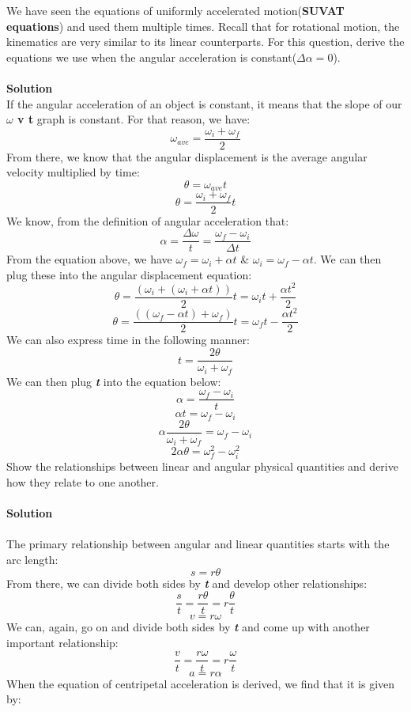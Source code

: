 \documentclass[9pt,addpoints]{exam}
\begin{document}
	
	\begin{questions}
		\question We have seen the equations of uniformly accelerated motion(\textbf{SUVAT equations}) and used them multiple times. Recall that for rotational motion, the kinematics are very similar to its linear counterparts. For this question, derive the equations we use when the angular acceleration is constant($\varDelta\alpha=0$). \\ \\
		\textbf{Solution} \\
		
		If the angular acceleration of an object is constant, it means that the slope of our \textbf{$\omega$ v t} graph is constant. For that reason, we have:
		$$\omega_{ave}=\dfrac{\omega_i+\omega_f}{2}$$
		From there, we know that the angular displacement is the average angular velocity multiplied by time:
		$$\theta=\omega_{ave}t$$
		$$\theta=\dfrac{\omega_i+\omega_f}{2}t$$
		We know, from the definition of angular acceleration that:
		$$\alpha=\dfrac{\varDelta\omega}{t}=\dfrac{\omega_f-\omega_i}{\varDelta t}$$
		From the equation above, we have $\omega_f=\omega_i+\alpha t$ \& $\omega_i=\omega_f-\alpha t$. We can then plug these into the angular displacement equation:
		$$\theta=\dfrac{(\omega_i+(\omega_i+\alpha t))}{2}t=\omega_i t+\dfrac{\alpha t^2}{2}$$
		$$\theta=\dfrac{((\omega_f-\alpha t)+\omega_f)}{2}t=\omega_f t-\dfrac{\alpha t^2}{2}$$
		We can also express time in the following manner:
		$$t=\dfrac{2\theta}{\omega_i+\omega_f}$$
		We can then plug \textit{\textbf{t}} into the equation below:
		$$\alpha=\dfrac{\omega_f-\omega_i}{t}$$
		$$\alpha t=\omega_f-\omega_i$$		
		$$\alpha\dfrac{2\theta}{\omega_i+\omega_f}=\omega_f-\omega_i$$		
		$$2\alpha\theta=\omega_f^2-\omega_i^2$$
		\question Show the relationships between linear and angular physical quantities and derive how they relate to one another. \\ \\
		\textbf{Solution} \\ \\
		The primary relationship between angular and linear quantities starts with the arc length:
		$$s=r\theta$$
		From there, we can divide both sides by \textbf{\textit{t}} and develop other relationships:
		$$\dfrac{s}{t}=\dfrac{r\theta}{t}=r\dfrac{\theta}{t}$$	
		$$v=r\omega$$
		We can, again, go on and divide both sides by \textbf{\textit{t}} and come up with another important relationship:
		$$\dfrac{v}{t}=\dfrac{r\omega}{t}=r\dfrac{\omega}{t}$$
		$$a=r\alpha$$
		\question When the equation of centripetal acceleration is derived, we find that it is given by:

\end{questions}
\end{document}
